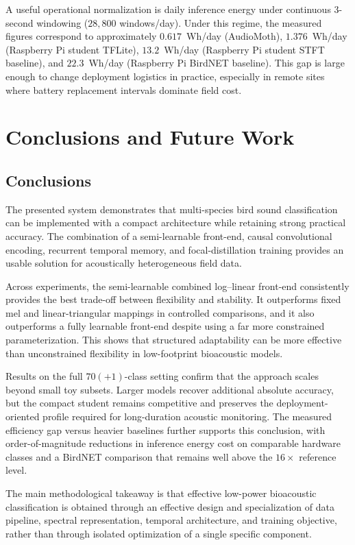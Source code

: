 \documentclass[a4paper,singleside,12pt]{report} %
\begin{document}
	A useful operational normalization is daily inference energy under continuous 3-second windowing (\(28{,}800\) windows/day). Under this regime, the measured figures correspond to approximately \(0.617\)~Wh/day (AudioMoth), \(1.376\)~Wh/day (Raspberry Pi student TFLite), \(13.2\)~Wh/day (Raspberry Pi student STFT baseline), and \(22.3\)~Wh/day (Raspberry Pi BirdNET baseline). This gap is large enough to change deployment logistics in practice, especially in remote sites where battery replacement intervals dominate field cost.

	\chapter{Conclusions and Future Work}
	\section{Conclusions}
	The presented system demonstrates that multi-species bird sound 
	classification can be implemented with a compact architecture while 
	retaining strong practical accuracy. The combination of a semi-learnable front-end, causal convolutional encoding, recurrent temporal memory, 
	and focal-distillation training provides an usable solution for acoustically heterogeneous field data.

	Across experiments, the semi-learnable combined log--linear front-end consistently provides the best trade-off between flexibility and stability. It outperforms fixed mel and linear-triangular mappings in controlled comparisons, and it also outperforms a fully learnable front-end despite using a far more constrained parameterization. This shows that structured adaptability can be more effective than unconstrained flexibility in low-footprint bioacoustic models.

	Results on the full \(70(+1)\)-class setting confirm that the approach scales beyond small toy subsets. Larger models recover additional absolute accuracy, but the compact student remains competitive and preserves the deployment-oriented profile required for long-duration acoustic monitoring. The measured efficiency gap versus heavier baselines further supports this conclusion, with order-of-magnitude reductions in inference energy cost on comparable hardware classes and a BirdNET comparison that remains well above the \(16\times\) reference level.

	The main methodological takeaway is that effective low-power bioacoustic classification is obtained through an effective design and specialization of data pipeline, spectral representation, temporal architecture, and training objective, rather than through isolated optimization of a single specific component.
\end{document}
